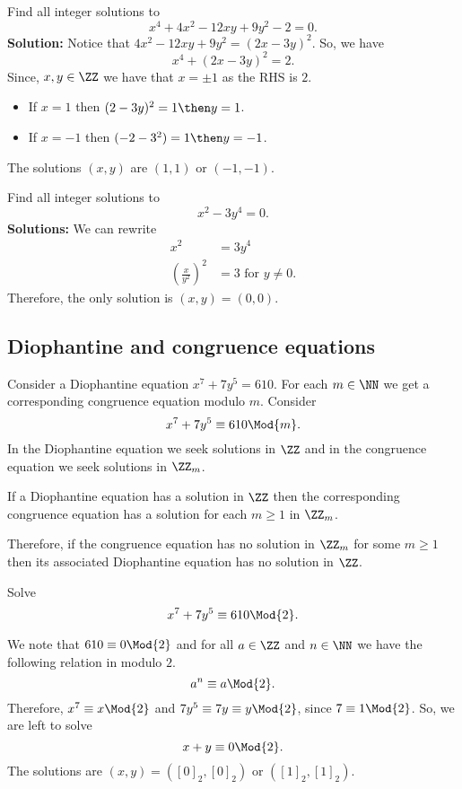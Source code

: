 \documentclass[12pt, a4paper]{article}
\begin{document}
\begin{example}
    Find all integer solutions to 
    \[x^4+4x^2-12xy+9y^2-2=0.\]
    \textbf{Solution:} Notice that \(4x^2-12xy+9y^2 =(2x-3y)^2\). So, we have 
    \[x^4 +(2x-3y)^2 =2.\]
    Since, \(x,y \in \ZZ\) we have that \(x=\pm 1\) as the RHS is \(2\).
    \begin{itemize}
        \item If \(x=1\) then \((2-3y)^2=1 \then y=1\).
        \item If \(x=-1\) then \((-2-3^2)=1 \then y=-1\).
    \end{itemize}
    The solutions \((x,y)\) are \((1,1)\) or \((-1,-1)\).
\end{example}

\begin{example}
    Find all integer solutions to
    \[x^2-3y^4=0.\]
    \textbf{Solutions:} We can rewrite
    \[\begin{aligned}
        x^2&=3y^4 \\
        \left( \frac{x}{y^2} \right)^2 &=3 \text{ for } y\neq 0.
    \end{aligned}\]
    Therefore, the only solution is \((x,y)=(0,0)\).
\end{example}

\subsection{Diophantine and congruence equations}

Consider a Diophantine equation \(x^7 +7y^5 =610\). For each \(m\in \NN\) we get a corresponding congruence equation modulo \(m\). Consider 
\[x^7 +7y^5 \equiv 610 \Mod{m}.\]
In the Diophantine equation we seek solutions in \(\ZZ\) and in the congruence equation we seek solutions in \(\ZZ_m\).

\begin{proposition}
    If a Diophantine equation has a solution in \(\ZZ\) then the corresponding congruence equation has a solution for each \(m\geq 1\) in \(\ZZ_m\).
\end{proposition}

\begin{mdnote}
    Therefore, if the congruence equation has no solution in \(\ZZ_m\) for some \(m\geq 1\) then its associated Diophantine equation has no solution in \(\ZZ\).
\end{mdnote}

\begin{example}
    Solve
    \[x^7 +7y^5 \equiv 610 \Mod{2}.\]
    \begin{solution}
        We note that \(610 \equiv 0 \Mod{2}\) and for all \(a \in \ZZ\) and \(n\in \NN\) we have the following relation in modulo \(2\).
    \[a^n \equiv a \Mod{2}.\]
    Therefore, \(x^7 \equiv x \Mod{2}\) and \(7y^5 \equiv 7y \equiv y \Mod{2}\), since \(7 \equiv 1 \Mod{2}\). So, we are left to solve
    \[x+y \equiv 0 \Mod{2}.\]
    The solutions are \((x,y)=([0]_2,[0]_2)\) or \(([1]_2,[1]_2)\).
    \end{solution}
\end{example}
\end{document}
